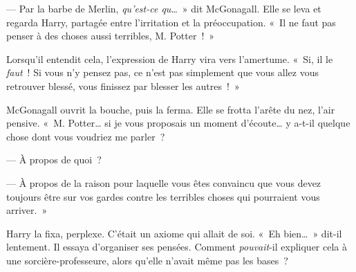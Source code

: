 --- Par la barbe de Merlin, \emph{qu'est-ce qu}…~» dit McGonagall. Elle se leva et regarda Harry, partagée entre l'irritation et la préoccupation.
«~Il ne faut pas penser à des choses aussi terribles, M. Potter~!~»

Lorsqu'il entendit cela, l'expression de Harry vira vers l'amertume.
«~Si, il le \emph{faut}~! Si vous n'y pensez pas, ce n'est pas simplement que vous allez vous retrouver blessé, vous finissez par blesser les autres~!~»

McGonagall ouvrit la bouche, puis la ferma. Elle se frotta l'arête du nez, l'air pensive.
«~M. Potter… si je vous proposais un moment d'écoute… y a-t-il quelque chose dont vous voudriez me parler~?

--- À propos de quoi~?

--- À propos de la raison pour laquelle vous êtes convaincu que vous devez toujours être sur vos gardes contre les terribles choses qui pourraient vous arriver.~»

Harry la fixa, perplexe. C'était un axiome qui allait de soi. «~Eh bien…~» dit-il lentement. Il essaya d'organiser ses pensées. Comment \emph{pouvait}-il expliquer cela à une sorcière-professeure, alors qu'elle n'avait même pas les bases~?

